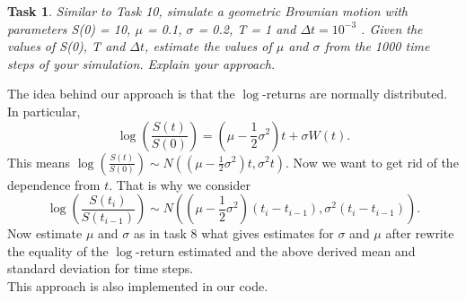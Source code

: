 \documentclass{scrartcl}
\newtheorem{task}{Task}
\begin{document}
	\begin{task}
		Similar to Task 10, simulate a geometric Brownian motion with parameters S(0) = 10, $\mu$ = 0.1, $\sigma$ =
		0.2, T = 1 and $\Delta t = 10^{-3}$ . Given the values of S(0), T and $\Delta t$, estimate the values of $\mu$ and $\sigma$
		from the 1000 time steps of your simulation. Explain your approach.
	\end{task}
	The idea behind our approach is that the $\log$-returns are normally distributed. In particular,
	\begin{equation}
		\log\left(\frac{S(t)}{S(0)}\right) = \left(\mu - \frac{1}{2}\sigma^2\right)t + \sigma W(t).
	\end{equation} 
	This means $\log\left(\frac{S(t)}{S(0)}\right) \sim N(\left(\mu - \frac{1}{2}\sigma^2\right)t, \sigma^2 t)$. Now we want to get rid of the dependence from $t$. That is why we consider
	\begin{equation}
		\log\left(\frac{S(t_i)}{S(t_{i-1})}\right) \sim N\left(\left(\mu - \frac{1}{2}\sigma^2\right)(t_i - t_{i-1}), \sigma^2 (t_i - t_{i-1})\right).
	\end{equation}
	Now estimate $\mu$ and $\sigma$ as in task 8 what gives estimates for $\sigma$ and $\mu$ after rewrite the equality of the $\log$-return estimated and the above derived mean and standard deviation for time steps. \\
	This approach is also implemented in our code.
	
\end{document}
